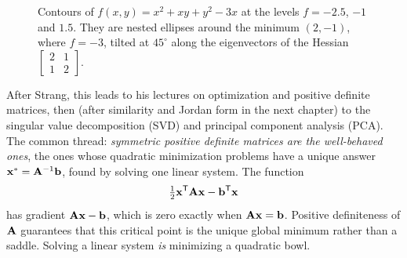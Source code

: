 \begin{figure}[htbp]
\centering
{}
\caption{Contours of $f(x,y) = x^2 + xy + y^2 - 3x$ at the levels $f = -2.5$, $-1$ and $1.5$. They
are nested ellipses around the minimum $(2,-1)$, where $f=-3$, tilted at $45^\circ$ along the
eigenvectors of the Hessian $\begin{bmatrix}2&1\\1&2\end{bmatrix}$.}
\label{ch27:fig-hessian}
\end{figure}

\begin{strangbox}
After Strang, this leads to his lectures on optimization and positive definite matrices, then (after
similarity and Jordan form in the next chapter) to the singular value decomposition (SVD) and
principal component analysis (PCA). The common thread: \emph{symmetric positive definite matrices are
the well-behaved ones}, the ones whose quadratic minimization problems have a unique answer
$\mathbf{x}^* = \mathbf{A}^{-1}\mathbf{b}$, found by solving one linear system. The function
\[
  \tfrac12\mathbf{x}^{\mathsf{T}}\mathbf{A}\mathbf{x} - \mathbf{b}^{\mathsf{T}}\mathbf{x}
\]
has gradient $\mathbf{A}\mathbf{x}-\mathbf{b}$, which is zero exactly when $\mathbf{A}\mathbf{x}=\mathbf{b}$. Positive
definiteness of $\mathbf{A}$ guarantees that this critical point is the unique global minimum rather
than a saddle. Solving a linear system \emph{is} minimizing a quadratic bowl.
\end{strangbox}

